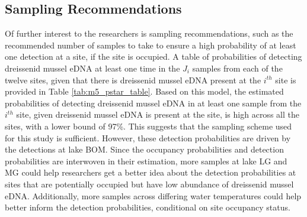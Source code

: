\documentclass[12pt]{article}\usepackage[]{graphicx}\usepackage[]{color}
\begin{document}
\subsection{Sampling Recommendations}

Of further interest to the researchers is sampling recommendations, such as the recommended number of samples to take to ensure a high probability of at least one detection at a site, if the site is occupied. A table of probabilities of detecting dreissenid mussel eDNA at least one time in the $J_i$ samples from each of the twelve sites, given that there is dreissenid mussel eDNA present at the $i^{th}$ site is provided in Table \ref{tab:m5_pstar_table}. Based on this model, the estimated probabilities of detecting dreissenid mussel eDNA in at least one sample from the $i^{th}$ site, given dreissenid mussel eDNA is present at the site, is high across all the sites, with a lower bound of 97\%. This suggests that the sampling scheme used for this study is sufficient. However, these detection probabilities are driven by the detections at lake BOM. Since the occupancy probabilities and detection probabilities are interwoven in their estimation, more samples at lake LG and MG could help researchers get a better idea about the detection probabilities at sites that are potentially occupied but have low abundance of dreissenid mussel eDNA. Additionally, more samples across differing water temperatures could help better inform the detection probabilities, conditional on site occupancy status. 
 
\end{document}
